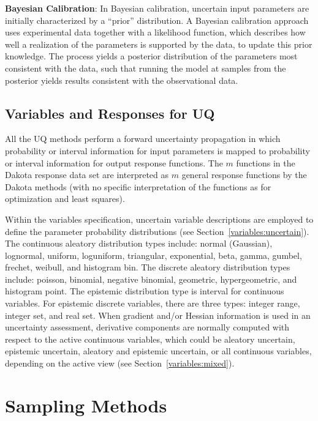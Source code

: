\textbf{Bayesian Calibration}: In Bayesian calibration, uncertain
input parameters are initially characterized by a ``prior''
distribution. A Bayesian calibration approach uses experimental data
together with a likelihood function, which describes how well a
realization of the parameters is supported by the data, to update this
prior knowledge. The process yields a posterior distribution of the
parameters most consistent with the data, such that running the model
at samples from the posterior yields results consistent with the
observational data.


\subsection{Variables and Responses for UQ}\label{uq:overview:varsresp}

All the UQ methods perform a forward uncertainty propagation in which
probability or interval information for input parameters is mapped to
probability or interval information for output response functions. The
$m$ functions in the Dakota response data set are interpreted as $m$
general response functions by the Dakota methods (with no specific
interpretation of the functions as for optimization and least
squares).

Within the variables specification, uncertain variable descriptions
are employed to define the parameter probability distributions (see
Section~\ref{variables:uncertain}). The continuous aleatory
distribution types include: normal (Gaussian), lognormal, uniform,
loguniform, triangular, exponential, beta, gamma, gumbel, frechet,
weibull, and histogram bin. The discrete aleatory distribution types
include: poisson, binomial, negative binomial, geometric,
hypergeometric, and histogram point. The epistemic distribution type
is interval for continuous variables. For epistemic discrete
variables, there are three types: integer range, integer set, and real
set.  When gradient and/or Hessian information is used in an
uncertainty assessment, derivative components are normally computed
with respect to the active continuous variables, which could be
aleatory uncertain, epistemic uncertain, aleatory and epistemic
uncertain, or all continuous variables, depending on the active view
(see Section~\ref{variables:mixed}).

\section{Sampling Methods}\label{uq:sampling}

